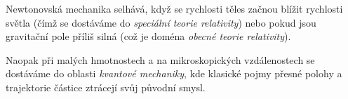 Newtonovská mechanika selhává, když se rychlosti těles začnou blížit rychlosti světla (čímž se dostáváme do \emph{speciální teorie relativity}) nebo pokud jsou gravitační pole příliš silná (což je doména \emph{obecné teorie relativity}).

Naopak při malých hmotnostech a na mikroskopických vzdálenostech se dostáváme do oblasti \emph{kvantové mechaniky}, kde klasické pojmy přesné polohy a trajektorie částice ztrácejí svůj původní smysl.